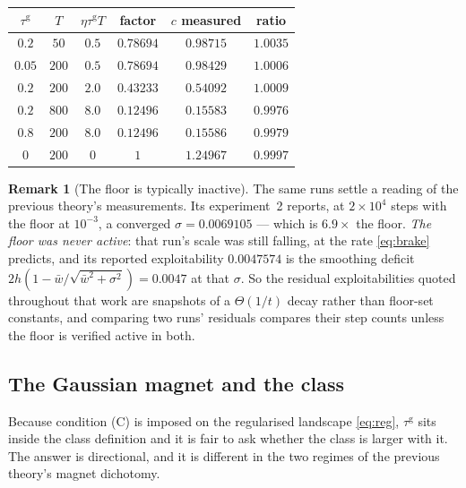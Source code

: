 \documentclass[11pt]{article}
\theoremstyle{definition}
\newtheorem{remark}{Remark}
\begin{document}
\begin{center}
\begin{tabular}{cccccc}
\hline
$\tau^{\mathrm g}$ & $T$ & $\eta\tau^{\mathrm g}T$ & factor & $c$ measured &
  ratio\\
\hline
$0.2$ & $50$ & $0.5$ & $0.78694$ & $0.98715$ & $1.0035$\\
$0.05$ & $200$ & $0.5$ & $0.78694$ & $0.98429$ & $1.0006$\\
$0.2$ & $200$ & $2.0$ & $0.43233$ & $0.54092$ & $1.0009$\\
$0.2$ & $800$ & $8.0$ & $0.12496$ & $0.15583$ & $0.9976$\\
$0.8$ & $200$ & $8.0$ & $0.12496$ & $0.15586$ & $0.9979$\\
$0$ & $200$ & $0$ & $1$ & $1.24967$ & $0.9997$\\
\hline
\end{tabular}
\end{center}

\begin{remark}[The floor is typically inactive]\label{rem:inactive}
The same runs settle a reading of the previous theory's measurements. Its
experiment~2 reports, at $2\times10^4$ steps with the floor at $10^{-3}$, a
converged $\sigma = 0.0069105$ --- which is $6.9\times$ the floor. \emph{The floor
was never active}: that run's scale was still falling, at the rate
\eqref{eq:brake} predicts, and its reported exploitability $0.0047574$ is the
smoothing deficit $2h(1 - \bar w/\sqrt{\bar w^2 + \sigma^2}) = 0.0047$ at that
$\sigma$. So the residual exploitabilities quoted throughout that work are
snapshots of a $\Theta(1/t)$ decay rather than floor-set constants, and comparing
two runs' residuals compares their step counts unless the floor is verified
active in both.
\end{remark}

\subsection{The Gaussian magnet and the class}\label{sec:magnet}

Because condition (C) is imposed on the regularised landscape \eqref{eq:reg},
$\tau^{\mathrm g}$ sits inside the class definition and it is fair to ask whether
the class is larger with it. The answer is directional, and it is different in
the two regimes of the previous theory's magnet dichotomy.
\end{document}
